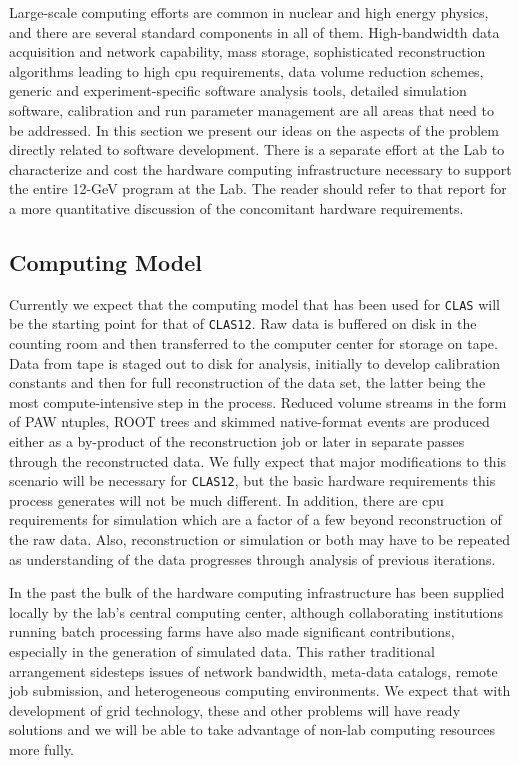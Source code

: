 \documentclass[12pt]{article}
\begin{document}
Large-scale computing efforts are common in nuclear and high energy physics, 
and there are several standard components in all of them. High-bandwidth data 
acquisition and network capability, mass storage, sophisticated reconstruction 
algorithms leading to high cpu requirements, data volume reduction schemes, 
generic and experiment-specific software analysis tools, detailed simulation 
software, calibration and run parameter management are all areas that need to 
be addressed. In this section we present our ideas on the aspects of the 
problem directly related to software development. There is a separate effort 
at the Lab to characterize and cost the hardware computing infrastructure 
necessary to support the entire 12-GeV program at the Lab. The reader 
should refer to that report for a more quantitative discussion of the 
concomitant hardware requirements.

\subsection{Computing Model}

Currently we expect that the computing model that has been used for 
{\tt CLAS} will be the starting point for that of {\tt CLAS12}.  Raw data 
is buffered on disk in the counting room and then transferred to the 
computer center for storage on tape.  Data from tape is staged out to disk 
for analysis, initially to develop calibration constants and then for full 
reconstruction of the data set, the latter being the most compute-intensive 
step in the process. Reduced volume streams in the form of PAW ntuples, 
ROOT trees and skimmed native-format events are produced either as a 
by-product of the reconstruction job or later in separate passes through 
the reconstructed data. We fully expect that major modifications to this 
scenario will be necessary for {\tt CLAS12}, but the basic hardware 
requirements this process generates will not be much different. In addition, 
there are cpu requirements for simulation which are a factor of a few beyond 
reconstruction of the raw data.  Also, reconstruction or simulation or both 
may have to be repeated as understanding of the data progresses through 
analysis of previous iterations.

In the past the bulk of the hardware computing infrastructure has been 
supplied locally by the lab's central computing center, although collaborating 
institutions running batch processing farms have also made significant 
contributions, especially in the generation of simulated data. This rather 
traditional arrangement sidesteps issues of network bandwidth, meta-data 
catalogs, remote job submission, and heterogeneous computing environments. 
We expect that with development of grid technology, these and other problems 
will have ready solutions and we will be able to take advantage of non-lab 
computing resources more fully.
\end{document}
